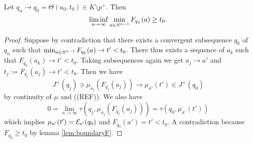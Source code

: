 \begin{lemma}\label{lem:unifconvawayfrommin}
    Let $q_n\to q_0=\Theta(a_0,t_0)\in K\setminus p^+$. Then 
    \[
        \liminf_{n\to \infty} \min_{a \in {S^{n-1}}} F_{q_n}(a) \ge t_0.
    \]
\end{lemma}
\begin{proof}
    Suppose by contradiction that there exists a convergent subsequence $q_k$ of $q_n$ such that $\min_{a \in {S^{n-1}}} F_{q_k}(a)\to t'<t_0$. There thus exists a sequence of $a_k$ such that $F_{q_k}(a_k)\to t'<t_0$. Taking subsequences again we get $a_j\to a'$ and $t_j:=F_{q_j}(a_j)\to t'<t_0$. Then we have 
    \[
        J^+(q_j)\ni \mu_{a_j}(F_{q_j}(a_j)) \to \mu_{a'}(t') \in J^+(q_0)
    \] by continuity of $\mu$ and ((REF)). We also have 
    \[
        0 = \lim_{n\to \infty}\tau(q_j,\mu_{a_j}(F_{q_j}(a_j))) = \tau(q_0,\mu_{a'}(t'))
    \] which implies $\mu_{a'}(t')={\mathcal{E}}_{a'}(q_0)$ and $F_{q_0}(a')=t'<t_0$. A contradiction because $F_{q_0}\ge t_0$ by lemma \ref{lem:boundaryF}.
\end{proof}

